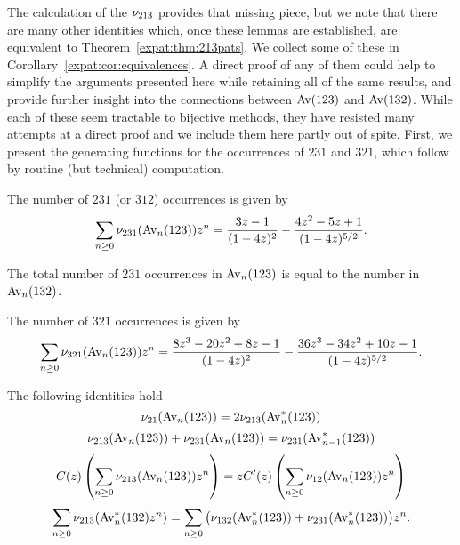     The calculation of the $\nu_{213}$ provides that missing piece, but we
    note that there are many other identities which, once these lemmas are
    established, are equivalent to Theorem~\ref{expat:thm:213pats}. We collect
    some of these in Corollary~\ref{expat:cor:equivalences}. A direct proof of
    any of them could help to simplify the arguments presented here while
    retaining all of the same results, and provide further insight into the
    connections between $\operatorname{{Av}}(123)$ and $\operatorname{{Av}}(132)$. While each of these
    seem tractable to bijective methods, they have resisted many attempts at a
    direct proof  and we include them here partly out of spite.
    First, we present the generating functions for the occurrences of $231$ and
    $321$, which follow by routine (but technical) computation. 
    
    

    \begin{theorem} \label{expat:thm:231pats}
      The number of $231$ (or $312$) occurrences is given by 
      $$\sum_{n \geq 0} \nu_{231}(\operatorname{{Av}}_n(123)) z^n=
      \frac{3z-1}{(1-4z)^{2}} - \frac{4z^2 - 5z + 1}{(1-4z)^{5/2}}.$$
    \end{theorem}

    \begin{corollary} \label{expat:cor:bridge}
      The total number of $231$ occurrences in $\operatorname{{Av}}_n(123)$ is equal to the
      number in $\operatorname{{Av}}_n(132)$. 
    \end{corollary}

    \begin{theorem}
      The number of $321$ occurrences is given by 
      $$
        \sum_{n\geq 0} \nu_{321}(\operatorname{{Av}}_n (123)) z^n =
        \frac{ 8z^3 - 20z^2 + 8z - 1}{(1-4z)^{2}}
        - \frac{36z^3 - 34z^2 + 10z - 1}{(1-4z)^{5/2}}.
      $$
    \end{theorem}


    \begin{corollary} \label{expat:cor:equivalences}
      The following identities hold 
      $$ \nu_{21}(\operatorname{{Av}}_n(123)) = 2\nu_{213}(\operatorname{{Av}}_n^*(123)) $$
      $$ \nu_{213}(\operatorname{{Av}}_n(123)) + \nu_{231}(\operatorname{{Av}}_n(123)) = \nu_{231} (\operatorname{{Av}}
      _{n-1}^*(123))$$
      $$ C(z) \left(\sum_{n\geq 0} \nu_{213}(\operatorname{{Av}}_n(123)) z^n \right) =
        z C'(z) \left(\sum_{n \geq 0} \nu_{12}(\operatorname{{Av}}_n(123))z^n \right) $$
      $$ \sum_{n\geq 0} \nu_{213} (\operatorname{{Av}}_n^* (132)  z^n) =
        \sum_{n \geq 0} \big(\nu_{132}(\operatorname{{Av}}_n^*(123)) +
        \nu_{231}(\operatorname{{Av}}_n^*(123))\big)z^n. $$
    \end{corollary}




